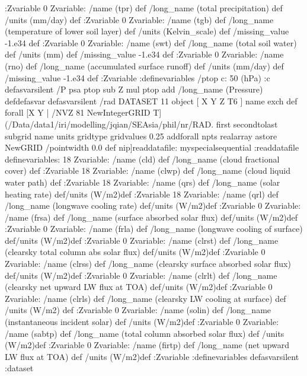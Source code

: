 \begin{ingrid}
{:Zvariable
0 Zvariable: /name (tpr) def /long_name (total precipitation)  def /units (mm/day) def
:Zvariable
0 Zvariable: /name (tgb) def /long_name (temperature of lower soil layer) def /units (Kelvin_scale) def
/missing_value -1.e34 def
:Zvariable
0 Zvariable: /name (swt) def /long_name (total soil water)  def /units (mm) def
/missing_value -1.e34 def
:Zvariable
0 Zvariable: /name (rno) def /long_name (accumulated surface runoff)  def /units (mm/day) def
/missing_value -1.e34 def
:Zvariable
:definevariables
 /ptop c:
    50 (hPa) :c
    defasvarsilent
  /P {psa ptop sub Z mul ptop add /long_name (Pressure) def}defasvar
} defasvarsilent
/rad {
DATASET 11 object
[ X Y Z T6 ] {  name exch def } forall
[X
    Y | 
/NVZ 81 NewIntegerGRID
    T] (/Data/data1/iri/modelling/jqian/SEAsia/phil/nr/RAD.%
        first secondtolast subgrid
        name units gridtype gridvalues
            {0.25 add}forall npts realarray astore
            NewGRID
         /pointwidth 0.0 def
         nip]readdatafile: 
myspecialsequential
:readdatafile
definevariables:
18 Zvariable: /name (cld) def /long_name (cloud fractional cover) def :Zvariable
18 Zvariable: /name (clwp) def /long_name (cloud liquid water path) def :Zvariable
18 Zvariable: /name (qrs) def /long_name (solar heating rate) def/units (W/m2)def  :Zvariable
18 Zvariable: /name (qrl) def /long_name (longwave cooling rate) def/units (W/m2)def  :Zvariable
0 Zvariable: /name (frsa) def /long_name (surface absorbed solar flux) def/units (W/m2)def  :Zvariable
0 Zvariable: /name (frla) def /long_name (longwave cooling of surface) def/units (W/m2)def  :Zvariable
0 Zvariable: /name (clrst) def /long_name (clearsky total column abs solar flux) def/units (W/m2)def  :Zvariable
0 Zvariable: /name (clrss) def /long_name (clearsky surface absorbed solar flux) def/units (W/m2)def  :Zvariable
0 Zvariable: /name (clrlt) def /long_name (clearsky net upward LW flux at TOA) def/units (W/m2)def  :Zvariable
0 Zvariable: /name (clrls) def /long_name (clearsky LW cooling at surface) def /units (W/m2) def :Zvariable
0 Zvariable: /name (solin) def /long_name (instantaneous incident solar) def /units (W/m2)def :Zvariable
0 Zvariable: /name (sabtp) def /long_name (total column absorbed solar flux) def /units (W/m2)def :Zvariable
0 Zvariable: /name (firtp) def /long_name (net upward LW flux at TOA) def /units (W/m2)def :Zvariable
:definevariables
}defasvarsilent
:dataset
\end{ingrid}
